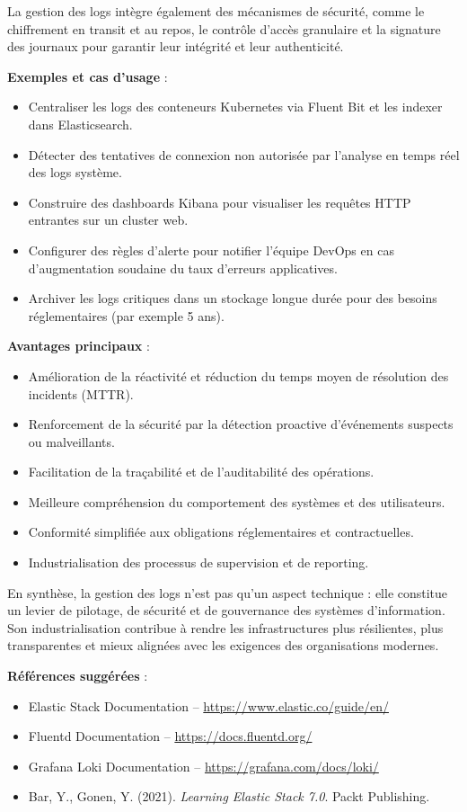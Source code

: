 La gestion des logs intègre également des mécanismes de sécurité, comme le chiffrement en transit et au repos, le contrôle d’accès granulaire et la signature des journaux pour garantir leur intégrité et leur authenticité.

\textbf{Exemples et cas d’usage} :
\begin{itemize}
	\item Centraliser les logs des conteneurs Kubernetes via Fluent Bit et les indexer dans Elasticsearch.
	\item Détecter des tentatives de connexion non autorisée par l’analyse en temps réel des logs système.
	\item Construire des dashboards Kibana pour visualiser les requêtes HTTP entrantes sur un cluster web.
	\item Configurer des règles d’alerte pour notifier l’équipe DevOps en cas d’augmentation soudaine du taux d’erreurs applicatives.
	\item Archiver les logs critiques dans un stockage longue durée pour des besoins réglementaires (par exemple 5 ans).
\end{itemize}

\textbf{Avantages principaux} :
\begin{itemize}
	\item Amélioration de la réactivité et réduction du temps moyen de résolution des incidents (MTTR).
	\item Renforcement de la sécurité par la détection proactive d’événements suspects ou malveillants.
	\item Facilitation de la traçabilité et de l’auditabilité des opérations.
	\item Meilleure compréhension du comportement des systèmes et des utilisateurs.
	\item Conformité simplifiée aux obligations réglementaires et contractuelles.
	\item Industrialisation des processus de supervision et de reporting.
\end{itemize}

En synthèse, la gestion des logs n’est pas qu’un aspect technique  : elle constitue un levier de pilotage, de sécurité et de gouvernance des systèmes d’information. Son industrialisation contribue à rendre les infrastructures plus résilientes, plus transparentes et mieux alignées avec les exigences des organisations modernes.

\textbf{Références suggérées} :
\begin{itemize}
	\item Elastic Stack Documentation – \url{https://www.elastic.co/guide/en/}
	\item Fluentd Documentation – \url{https://docs.fluentd.org/}
	\item Grafana Loki Documentation – \url{https://grafana.com/docs/loki/}
	\item Bar, Y., Gonen, Y. (2021). \textit{Learning Elastic Stack 7.0}. Packt Publishing.
\end{itemize}

